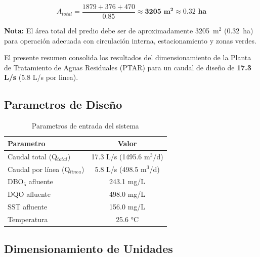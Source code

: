 \documentclass[12pt,a4paper]{article}
\begin{document}
\begin{equation}
A_{total} = \frac{1879 + 376 + 470}{0.85} \approx \mathbf{3205 \text{ m}^2} \approx \mathbf{0.32 \text{ ha}}
\end{equation}

\textbf{Nota:} El área total del predio debe ser de aproximadamente 3205~m$^2$ (0.32~ha) para operación adecuada con circulación interna, estacionamiento y zonas verdes.

\newpage



El presente resumen consolida los resultados del dimensionamiento de la Planta de Tratamiento de Aguas Residuales (PTAR) para un caudal de dise\~no de \textbf{17.3 L/s} (5.8 L/s por linea).

\subsection{Parametros de Dise\~no}

\begin{table}[H]
\centering
\caption{Parametros de entrada del sistema}
\begin{tabular}{lc}
\toprule
\textbf{Parametro} & \textbf{Valor} \\
\midrule
Caudal total (Q$_{total}$) & 17.3 L/s (1495.6 m$^3$/d) \\
Caudal por línea (Q$_{linea}$) & 5.8 L/s (498.5 m$^3$/d) \\
DBO$_5$ afluente & 243.1 mg/L \\
DQO afluente & 498.0 mg/L \\
SST afluente & 156.0 mg/L \\
Temperatura & 25.6 °C \\
\bottomrule
\end{tabular}
\end{table}

\subsection{Dimensionamiento de Unidades}
\end{document}
